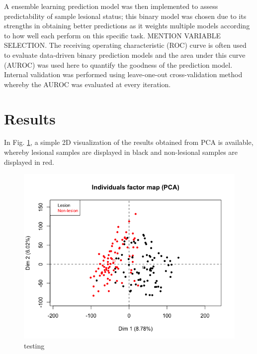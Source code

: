 \documentclass[journal, a4paper]{IEEEtran}
\begin{document}
A ensemble learning prediction model was then implemented to assess predictability of sample lesional status; this binary model was chosen due to its strengths in obtaining better predictions as it weights multiple models according to how well each perform on this specific task\cite{friedman2001elements}. MENTION VARIABLE SELECTION. The receiving operating characteristic (ROC) curve is often used to evaluate data-driven binary prediction models and the area under this curve (AUROC) was used here to quantify the goodness of the prediction model\cite{hanley1982meaning}. Internal validation was performed using leave-one-out cross-validation method whereby the AUROC was evaluated at every iteration\cite{efron1994introduction}. %


\section{Results}

In Fig. \ref{fig:pca}, a simple 2D visualization of the results obtained from PCA is available, whereby lesional samples are displayed in black and non-lesional samples are displayed in red.

\begin{figure}[!htp]
    \begin{center}
    \begin{minipage}{0.5 \textwidth}
      \centering
      \includegraphics[width=\textwidth]{../exploratory-data-analysis/pca-plot.png}
      \caption{testing}
      \label{fig:pca}
    \end{minipage}
  \end{center}
\end{figure}
\end{document}
